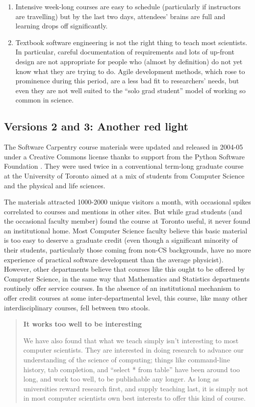 \documentclass[10pt,a4paper,twocolumn]{article}
\begin{document}
\begin{enumerate}
\item
  Intensive week-long courses are easy to schedule (particularly if
  instructors are travelling) but by the last two days, attendees'
  brains are full and learning drops off significantly.
\item
  Textbook software engineering is not the right thing to teach most
  scientists. In particular, careful documentation of requirements and
  lots of up-front design are not appropriate for people who (almost by
  definition) do not yet know what they are trying to do. Agile
  development methods, which rose to prominence during this period, are
  a less bad fit to researchers' needs, but even they are not well
  suited to the ``solo grad student'' model of working so common in
  science.
\end{enumerate}

\subsection*{Versions 2 and 3: Another red light}

The Software Carpentry course materials were updated and released in
2004-05 under a Creative Commons license thanks to support from the
Python Software Foundation \cite{wilson2006b}. They were used twice in
a conventional term-long graduate course at the University of Toronto
aimed at a mix of students from Computer Science and the physical and
life sciences.

The materials attracted 1000-2000 unique visitors a month, with
occasional spikes correlated to courses and mentions in other
sites. But while grad students (and the occasional faculty member)
found the course at Toronto useful, it never found an institutional
home.  Most Computer Science faculty believe this basic material is
too easy to deserve a graduate credit (even though a significant
minority of their students, particularly those coming from non-CS
backgrounds, have no more experience of practical software development
than the average physicist). However, other departments believe that
courses like this ought to be offered by Computer Science, in the same
way that Mathematics and Statistics departments routinely offer
service courses.  In the absence of an institutional mechanism to
offer credit courses at some inter-departmental level, this course,
like many other interdisciplinary courses, fell between two stools.

\begin{quote}
\textbf{It works too well to be interesting}

We have also found that what we teach simply isn't interesting to most
computer scientists. They are interested in doing research to advance
our understanding of the science of computing; things like command-line
history, tab completion, and ``select * from table'' have been around
too long, and work too well, to be publishable any longer. As long as
universities reward research first, and supply teaching last, it is
simply not in most computer scientists own best interests to offer this
kind of course.
\end{quote}
\end{document}
